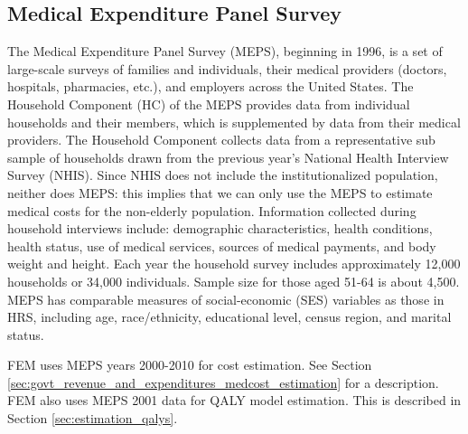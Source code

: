 \subsection{Medical Expenditure Panel Survey}
\label{sec:data_sources_estimation_meps}
The Medical Expenditure Panel Survey (MEPS), beginning in 1996, is a set of large-scale surveys of 
families and individuals, their medical providers (doctors, hospitals, pharmacies, etc.), and 
employers across the United States. The Household Component (HC) of the MEPS provides data from 
individual households and their members, which is supplemented by data from their medical providers. 
The Household Component collects data from a representative sub sample of households drawn from the 
previous year's National Health Interview Survey (NHIS). Since NHIS does not include the 
institutionalized population, neither does MEPS: this implies that we can only use the MEPS to 
estimate medical costs for the non-elderly population. Information collected during household 
interviews include: demographic characteristics, health conditions, health status, use of medical 
services, sources of medical payments, and body weight and height. Each year the household survey 
includes approximately 12,000 households or 34,000 individuals. Sample size for those aged 51-64 is 
about 4,500.  MEPS has comparable measures of social-economic (SES) variables as those in HRS, 
including age, race/ethnicity, educational level, census region, and marital status. 

FEM uses MEPS years 2000-2010 for cost estimation.  See Section 
\ref{sec:govt_revenue_and_expenditures_medcost_estimation} for a description.  FEM also
uses MEPS 2001 data for QALY model estimation. This is described in Section 
\ref{sec:estimation_qalys}.

